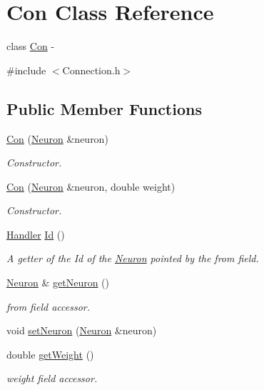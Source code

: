 \hypertarget{class_con}{
\section{Con Class Reference}
\label{class_con}
}


class \hyperlink{class_con}{Con} -\/  




{\ttfamily \#include $<$Connection.h$>$}

\subsection*{Public Member Functions}
\begin{DoxyCompactItemize}
\item 
\hyperlink{class_con_a7fab3ece0e894f44f31d10a21b1d49c7}{Con} (\hyperlink{class_neuron}{Neuron} \&neuron)
\begin{DoxyCompactList}\small\item\em Constructor. \end{DoxyCompactList}\item 
\hyperlink{class_con_ad0b1e0d1eefd2296b23a2cfea04fc559}{Con} (\hyperlink{class_neuron}{Neuron} \&neuron, double weight)
\begin{DoxyCompactList}\small\item\em Constructor. \end{DoxyCompactList}\item 
\hyperlink{_a_m_o_r_e_8h_abc871abb71cff6655b8172ee7240b8ef}{Handler} \hyperlink{class_con_aee0a0b6c5beff6e227f9ebf33af2d209}{Id} ()
\begin{DoxyCompactList}\small\item\em A getter of the Id of the \hyperlink{class_neuron}{Neuron} pointed by the from field. \end{DoxyCompactList}\item 
\hyperlink{class_neuron}{Neuron} \& \hyperlink{class_con_a2209567efd330a58825b5068a421afe1}{getNeuron} ()
\begin{DoxyCompactList}\small\item\em from field accessor. \end{DoxyCompactList}\item 
void \hyperlink{class_con_ae372f50a253a424376959fb6ee8f083b}{setNeuron} (\hyperlink{class_neuron}{Neuron} \&neuron)
\item 
double \hyperlink{class_con_a385c5bf6eb9e2ffc94c5b427c287ccb2}{getWeight} ()
\begin{DoxyCompactList}\small\item\em weight field accessor. \end{DoxyCompactList}\item 

\end{DoxyCompactItemize}
